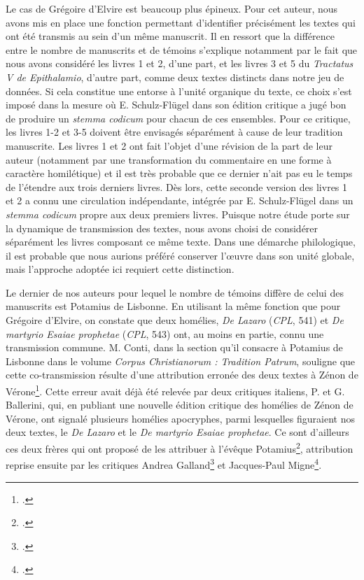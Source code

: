 \documentclass[a4paper,twoside,12pt]{book}
\begin{document}
Le cas de Grégoire d'Elvire est beaucoup plus épineux. Pour cet auteur, nous avons mis en place une fonction permettant d’identifier précisément les textes qui ont été transmis au sein d’un même manuscrit. Il en ressort que la différence entre le nombre de manuscrits et de témoins s’explique notamment par le fait que nous avons considéré les livres 1 et 2, d’une part, et les livres 3 et 5 du \textit{Tractatus V de Epithalamio}, d’autre part, comme deux textes distincts dans notre jeu de données. Si cela constitue une entorse à l’unité organique du texte, ce choix s’est imposé dans la mesure où E. Schulz-Flügel dans son édition critique a jugé bon de produire un \textit{stemma codicum} pour chacun de ces ensembles. Pour ce critique, les livres 1-2 et 3-5 doivent être envisagés séparément à cause de leur tradition manuscrite. Les livres 1 et 2 ont fait l'objet d'une révision de la part de leur auteur (notamment par une transformation du commentaire en une forme à caractère homilétique) et il est très probable que ce dernier n'ait pas eu le temps de l'étendre aux trois derniers livres.  Dès lors, cette seconde version des livres 1 et 2 a connu une circulation indépendante, intégrée par E. Schulz-Flügel dans un \textit{stemma codicum} propre aux deux premiers livres. Puisque notre étude porte sur la dynamique de transmission des textes, nous avons choisi de considérer séparément les livres composant ce même texte. Dans une démarche philologique, il est probable que nous aurions préféré conserver l’œuvre dans son unité globale, mais l’approche adoptée ici requiert cette distinction.


Le dernier de nos auteurs pour lequel le nombre de témoins diffère de celui des manuscrits est Potamius de Lisbonne. En utilisant la même fonction que pour Grégoire d'Elvire, on constate que deux homélies, \textit{De Lazaro} (\textit{CPL}, 541) et \textit{De martyrio Esaiae prophetae} (\textit{CPL}, 543) ont, au moins en partie, connu une transmission commune. M. Conti, dans la section qu’il consacre à Potamius de Lisbonne dans le volume \textit{Corpus Christianorum : Tradition Patrum}, souligne que cette co-transmission résulte d’une attribution erronée des deux textes à Zénon de Vérone\footcite[p. 43 et 54]{TradPat}. Cette erreur avait déjà été relevée par deux critiques italiens, P. et G. Ballerini, qui, en publiant une nouvelle édition critique des homélies de Zénon de Vérone, ont signalé plusieurs homélies apocryphes, parmi lesquelles figuraient nos deux textes, le \textit{De Lazaro} et le \textit{De martyrio Esaiae prophetae}. Ce sont d’ailleurs ces deux frères qui ont proposé de les attribuer à l’évêque Potamius\footcite[p.~ XXX--XXXI]{Ballerini}, attribution reprise ensuite par les critiques Andrea Galland\footcite[p. 96--99]{Galland} et Jacques-Paul Migne\footcite[coll. 1411--1415]{migne8}. \\
\end{document}
